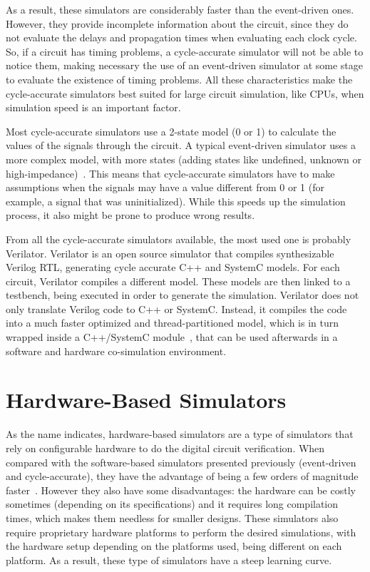 As a result, these simulators are considerably faster than the event-driven
ones. However, they provide incomplete information about the circuit, since they
do not evaluate the delays and propagation times when evaluating each clock
cycle. So, if a circuit has timing problems, a cycle-accurate simulator will not
be able to notice them, making necessary the use of an event-driven simulator at
some stage to evaluate the existence of timing problems. All these
characteristics make the cycle-accurate simulators best suited for large circuit
simulation, like CPUs, when simulation speed is an important factor.

Most cycle-accurate simulators use a 2-state model (0 or 1) to calculate the
values of the signals through the circuit. A typical event-driven simulator uses
a more complex model, with more states (adding states like undefined, unknown or
high-impedance)~\cite{bennett:verilator}. This means that cycle-accurate
simulators have to make assumptions when the signals may have a value different
from 0 or 1 (for example, a signal that was uninitialized). While this speeds up
the simulation process, it also might be prone to produce wrong results.

From all the cycle-accurate simulators available, the most used one is probably
Verilator. Verilator is an open source simulator that compiles synthesizable
Verilog RTL, generating cycle accurate C++ and SystemC models. For each circuit, Verilator
compiles a different model. These models are
then linked to a testbench, being executed in order to generate the
simulation. Verilator does not only translate Verilog code to C++ or
SystemC. Instead, it compiles the code into a much faster optimized and
thread-partitioned model, which is in turn wrapped inside a C++/SystemC
module~\cite{veripool:verilator}, that can be used afterwards in a software and hardware 
co-simulation environment.

\section{Hardware-Based Simulators}
\label{subsection:hardware}

As the name indicates, hardware-based simulators are a type of simulators that
rely on configurable hardware to do the digital circuit verification. When
compared with the software-based simulators presented previously (event-driven and 
cycle-accurate), they have the advantage of being a
few orders of magnitude faster~\cite{tan:vhstas}. However they also have some
disadvantages: the hardware can be costly sometimes (depending on its
specifications) and it requires long compilation times, which makes them
needless for smaller designs. These simulators also require proprietary hardware
platforms to perform the desired simulations, with the hardware setup depending
on the platforms used, being different on each platform. As a result, these type
of simulators have a steep learning curve.

